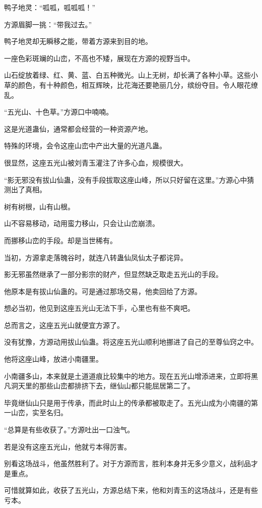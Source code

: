\begin{this_body}
鸭子地灵：“呱呱，呱呱呱！”

方源眉脚一挑：“带我过去。”

鸭子地灵却无瞬移之能，带着方源来到目的地。

一座色彩斑斓的山峦，不高也不矮，展现在方源的视野当中。

山石绽放着绿、红、黄、蓝、白五种微光。山上无树，却长满了各种小草。这些小草的颜色，有十种颜色，相互辉映，比花海还要艳丽几分，缤纷夺目。令人眼花缭乱。

“五光山、十色草。”方源口中喃喃。

这是光道蛊仙，通常都会经营的一种资源产地。

特殊的环境，会令这座山峦中产出大量的光道凡蛊。

很显然，这座五光山被刘青玉灌注了许多心血，规模很大。

“影无邪没有拔山仙蛊，没有手段拔取这座山峰，所以只好留在这里。”方源心中猜测出了真相。

树有树根，山有山根。

山不容易移动，动用蛮力移山，只会让山峦崩溃。

而挪移山峦的手段。却是当世稀有。

当初，方源拿走落魄谷时，就连八转蛊仙凤仙太子都诧异。

影无邪虽然继承了一部分影宗的财产，但显然缺乏取走五光山的手段。

他原本是有拔山仙蛊的。可是通过那场交易，他卖回给了方源。

想必当初，他见到这座五光山无法下手，心里也有些不爽吧。

总而言之，这座五光山就便宜方源了。

没有犹豫，方源动用拔山仙蛊。将这座五光山顺利地挪进了自己的至尊仙窍之中。

他将这座山峰，放进小南疆里。

小南疆多山，本来就是土道道痕比较集中的地方。现在五光山增添进来，立即将黑凡洞天里的那些山峦都排挤下去，继仙山都只能屈居第二了。

毕竟继仙山只是用于传承，而此时山上的传承都被取走了。五光山成为小南疆的第一山峦，实至名归。

“总算是有些收获了。”方源吐出一口浊气。

若是没有这座五光山，他就亏本得厉害。

别看这场战斗，他虽然胜利了。对于方源而言，胜利本身并无多少意义，战利品才是重点。

可惜就算如此，收获了五光山，方源总结下来，他和刘青玉的这场战斗，还是有些亏本。


\end{this_body}
